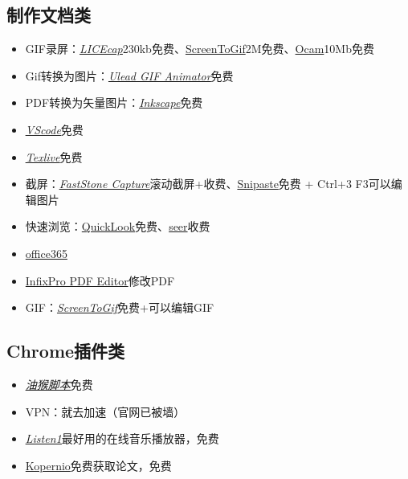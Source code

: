 \documentclass[UTF8]{ctexbook}
\begin{document}
\subsection{制作文档类}
\begin{itemize}
	\item GIF录屏：\underline{\textit{\href{https://www.cockos.com/licecap/}{LICEcap}}}\quad 230kb免费、\href{https://www.screentogif.com/?l=zh_cn}{ScreenToGif}\quad 2M免费、\href{https://ocam.en.softonic.com}{Ocam}\quad 10Mb免费
	\item Gif转换为图片：\underline{\textit{\href{https://ulead-gif-animator.jaleco.com}{Ulead GIF Animator}}}\quad 免费
	\item PDF转换为矢量图片：\underline{\textit{\href{https://inkscape.org}{Inkscape}}}\quad 免费
	\item \underline{\textit{\href{https://code.visualstudio.com}{VScode}}}\quad 免费
	\item \underline{\textit{\href{https://mirrors.tuna.tsinghua.edu.cn/CTAN/systems/texlive/Images/}{Texlive}}}\quad 免费
	\item 截屏：\underline{\textit{\href{http://www.faststone.org/FSCaptureDetail.htm}{FastStone Capture}}}\quad 滚动截屏+收费、\href{https://www.snipaste.com}{Snipaste}\quad 免费 + Ctrl+3 F3可以编辑图片
	\item 快速浏览：\href{https://pooi.moe/QuickLook/}{QuickLook}\quad 免费、\href{http://1218.io}{seer}\quad 收费
	\item \href{https://otp.landian.vip/zh-cn/}{office365}
	\item \href{http://www.dayanzai.me/infixpro-pdf-editor.html}{InfixPro PDF Editor}\quad 修改PDF
	\item GIF：\underline{\textit{\href{https://www.screentogif.com/}{ScreenToGif}}}\quad 免费+可以编辑GIF
\end{itemize}

\subsection{Chrome插件类}
\begin{itemize}
	\item \underline{\textit{\href{https://greasyfork.org/zh-CN}{油猴脚本}}}\quad 免费
	\item VPN：就去加速（官网已被墙）
	\item \underline{\textit{\href{http://listen1.github.io/listen1/}{Listen1}}}\quad 最好用的在线音乐播放器，免费
	\item \href{https://kopernio.com}{Kopernio}\quad 免费获取论文，免费
\end{itemize}
\end{document}
